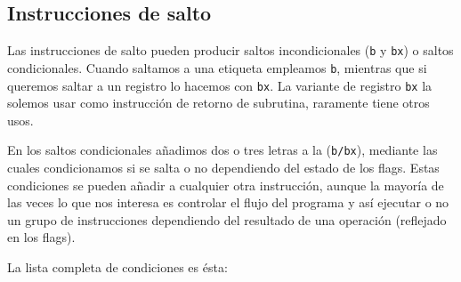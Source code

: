 \subsection{Instrucciones de salto}
\label{sec:InsSal}

Las instrucciones de salto pueden producir saltos incondicionales ({\tt b} y {\tt bx})
o saltos condicionales. Cuando saltamos a una etiqueta empleamos {\tt b}, mientras que
si queremos saltar a un registro lo hacemos con {\tt bx}. La variante de registro {\tt bx}
la solemos usar como instrucción de retorno de subrutina, raramente tiene otros usos.

En los saltos condicionales añadimos dos o tres letras
a la ({\tt b/bx}), mediante las cuales condicionamos si se salta o no dependiendo
del estado de los flags. Estas condiciones se pueden añadir a cualquier
otra instrucción, aunque la mayoría de las veces lo que nos interesa es controlar
el flujo del programa y así ejecutar o no un grupo de instrucciones dependiendo
del resultado de una operación (reflejado en los flags).

\newpage
La lista completa de condiciones es ésta:

